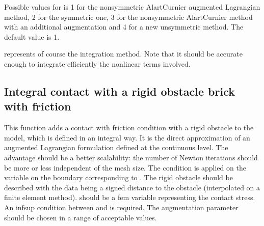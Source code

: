 \documentclass[a4paper,11pt,english]{sphinxmanual}
\begin{document}
Possible values for  is 1 for the non\sphinxhyphen{}symmetric Alart\sphinxhyphen{}Curnier
augmented Lagrangian method, 2 for the symmetric one, 3 for the
non\sphinxhyphen{}symmetric Alart\sphinxhyphen{}Curnier method with an additional augmentation
and 4 for a new unsymmetric method. The default value is 1.

 represents of course the integration method. Note that it should
be accurate enough to integrate efficiently the nonlinear terms involved.


\subsection{Integral contact with a rigid obstacle brick with friction}
\label{\detokenize{userdoc/model_contact_friction:integral-contact-with-a-rigid-obstacle-brick-with-friction}}
\begin{sphinxVerbatim}[commandchars=\\\{\}]
         
            
             
\end{sphinxVerbatim}

This function adds a contact with friction condition with a rigid obstacle
to the model, which is defined in an integral way. It is the direct
approximation of an augmented Lagrangian formulation defined at the
continuous level.
The advantage should be a better scalability: the number of Newton
iterations should be more or less independent of the mesh size.
The condition is applied on the variable 
on the boundary corresponding to . The rigid obstacle should
be described with the data  being a signed distance to
the obstacle (interpolated on a finite element method).
 should be a fem variable representing the contact stress.
An inf\sphinxhyphen{}sup condition between  and  is required.
The augmentation parameter  should be chosen in a
range of acceptable values.
\end{document}
